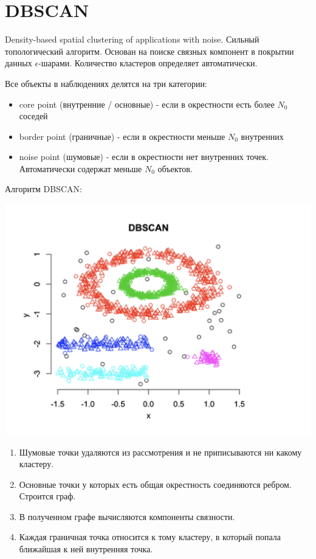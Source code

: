 \documentclass[a4paper, oneside]{book}
\begin{document}
\section{DBSCAN}
Density-based spatial clustering of applications with noise. Сильный
топологический алгоритм. Основан на поиске связных компонент в покрытии данных
$\epsilon$-шарами. Количество кластеров определяет автоматически.

Все объекты в наблюдениях делятся на три категории:
\begin{itemize}
    \item core point (внутренние / основные) - если в окрестности есть более
        $N_0$ соседей

    \item border point (граничные) - если в окрестности меньше $N_0$ внутренних

    \item noise point (шумовые) - если в окрестности нет внутренних точек.
        Автоматически содержат меньше $N_0$ объектов.
\end{itemize}

Алгоритм DBSCAN:
\begin{marginfigure}
    \includegraphics[width=1.3\columnwidth]{pics/dbscan.jpeg}
    \label{fig:boxplot}
\end{marginfigure}
\begin{enumerate}
    \item Шумовые точки удаляются из рассмотрения и не приписываются ни какому
        кластеру.

    \item Основные точки у которых есть общая окрестность соединяются ребром.
        Строится граф.

    \item В полученном графе вычисляются компоненты связности.

    \item Каждая граничная точка относится к тому кластеру, в который попала
        ближайшая к ней внутренняя точка.
\end{enumerate}
\end{document}
